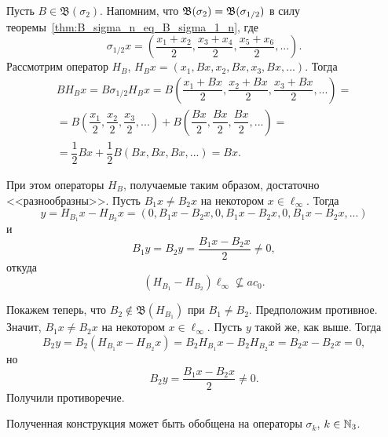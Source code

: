 \begin{example}
	Пусть $B\in\mathfrak B(\sigma_2)$.
	Напомним, что $\mathfrak{B}(\sigma_2) = \mathfrak{B}(\sigma_{1/2})$ в силу теоремы~\ref{thm:B_sigma_n_eq_B_sigma_1_n}, где
	\begin{equation}
		\sigma_{1/2} x = \left(\dfrac{x_1+x_2}2, \dfrac{x_3+x_4}2, \dfrac{x_5+x_6}2, ...\right)
		.
	\end{equation}
	Рассмотрим оператор $H_B$, $H_Bx = (x_1, Bx, x_2, Bx, x_3, Bx, ...)$.
	Тогда
	\begin{multline}
		B H_B x = B \sigma_{1/2} H_B x = B\left(\dfrac{x_1+Bx}2, \dfrac{x_2+Bx}2, \dfrac{x_3+Bx}2, ...\right) =
		\\=
		B\left(\dfrac{x_1}2, \dfrac{x_2}2, \dfrac{x_3}2, ...\right) + B\left(\dfrac{Bx}2, \dfrac{Bx}2, \dfrac{Bx}2, ...\right)=
		\\=
		\dfrac12 Bx + \dfrac12 B\left(Bx, Bx, Bx, ...\right) = Bx
		.
	\end{multline}

	При этом операторы $H_B$, получаемые таким образом, достаточно <<разнообразны>>.
	Пусть $B_1 x \ne B_2 x$ на некотором $x\in \ell_\infty$.
	Тогда
	\begin{equation}
		y = H_{B_1} x - H_{B_2} x = (0, B_1 x - B_2 x, 0, B_1 x - B_2 x, 0, B_1 x - B_2 x, ...)
	\end{equation}
	 и
	\begin{equation}
		B_1y = B_2y = \dfrac{B_1 x - B_2 x}2\ne 0
		,
	\end{equation}
	откуда
	\begin{equation}
		(H_{B_1} - H_{B_2})\ell_\infty \not\subseteq ac_0
		.
	\end{equation}


	Покажем  теперь, что $B_2 \notin \mathfrak B (H_{B_1})$ при $B_1 \ne B_2$. Предположим противное. Значит, $B_1 x \ne B_2 x$ на некотором $x\in \ell_\infty$. Пусть $y$ такой же, как выше. Тогда
	\begin{equation}
		B_2 y = B_2(H_{B_1} x - H_{B_2} x) = B_2 H_{B_1} x - B_2 H_{B_2} x = B_2 x - B_2 x = 0
		,
	\end{equation}
	но
	\begin{equation}
		B_2 y = \dfrac{B_1x - B_2 x}{2} \ne 0
		.
	\end{equation}
	Получили противоречие.
\end{example}

Полученная конструкция может быть обобщена на операторы $\sigma_k$, $k\in\mathbb{N}_3$.

